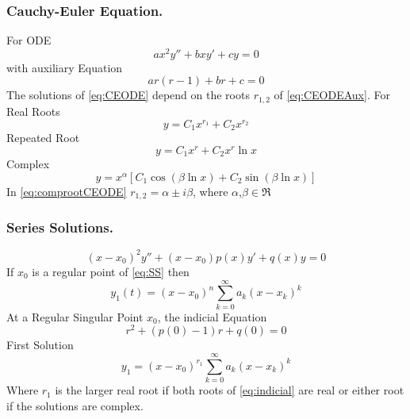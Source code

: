 \documentclass[../../main.tex]{subfiles}
\begin{document}
\subsubsection{Cauchy-Euler Equation.} For ODE
\begin{equation}
ax^2y''+bxy'+cy=0 \label{eq:CEODE}
\end{equation}
with auxiliary Equation
\begin{equation}
ar(r-1)+br+c=0\label{eq:CEODEAux}
\end{equation}
The solutions of \eqref{eq:CEODE} depend on the roots $r_{1,2}$ of \eqref{eq:CEODEAux}. For Real Roots
\begin{equation*}
y = C_1x^{r_1} + C_2x^{r_2}
\end{equation*}
Repeated Root
\begin{equation*}
y = C_1 x^r + C_2 x^r \ln x
\end{equation*}
Complex
\begin{equation}
y=x^{\alpha}[C_1\cos(\beta \ln x) + C_2 \sin (\beta \ln x)] \label{eq:comprootCEODE}
\end{equation}
In \eqref{eq:comprootCEODE} $r_{1,2}=\alpha\pm i\beta$, where $\alpha$,$\beta\in\Re$

\subsubsection{Series Solutions.} 
\begin{equation}
(x-x_0)^2y''+(x-x_0)p(x)y'+q(x)y=0 \label{eq:SS}
\end{equation}
If $x_0$ is a regular point of \eqref{eq:SS} then 
\begin{equation*}
y_1(t) = (x-x_0)^n\sum_{k=0}^{\infty}a_k(x-x_k)^k
\end{equation*}
At a Regular Singular Point $x_0$, the indicial Equation
\begin{equation}
r^2+(p(0)-1)r + q(0)=0 \label{eq:indicial}
\end{equation}
First Solution
\begin{equation*}
y_1=(x-x_0)^{r_1}\sum_{k=0}^{\infty}a_k(x-x_k)^k
\end{equation*}
Where $r_1$ is the larger real root if both roots of \eqref{eq:indicial} are real or either root if the solutions are complex. 
\end{document}
